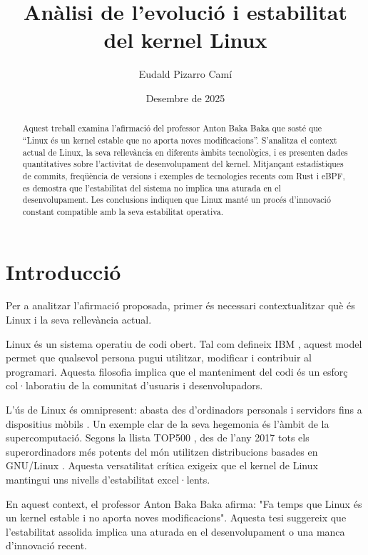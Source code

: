 \documentclass{article}
\title{Anàlisi de l'evolució i estabilitat del kernel Linux}
\author{Eudald Pizarro Camí}
\date{Desembre de 2025}
\begin{document}
\maketitle

\newpage 

\tableofcontents

\newpage 

\begin{abstract}
Aquest treball examina l'afirmació del professor Anton Baka Baka que sosté que ``Linux és un kernel estable que no aporta noves modificacions''. S'analitza el context actual de Linux, la seva rellevància en diferents àmbits tecnològics, i es presenten dades quantitatives sobre l'activitat de desenvolupament del kernel. Mitjançant estadístiques de commits, freqüència de versions i exemples de tecnologies recents com Rust i eBPF, es demostra que l'estabilitat del sistema no implica una aturada en el desenvolupament. Les conclusions indiquen que Linux manté un procés d'innovació constant compatible amb la seva estabilitat operativa.
\end{abstract}

\newpage

\section{Introducció}

Per a analitzar l'afirmació proposada, primer és necessari contextualitzar què és Linux i la seva rellevància actual.

Linux és un sistema operatiu de codi obert. Tal com defineix IBM \cite{ibm_open_source}, aquest model permet que qualsevol persona pugui utilitzar, modificar i contribuir al programari. Aquesta filosofia implica que el manteniment del codi és un esforç col·laboratiu de la comunitat d'usuaris i desenvolupadors.

L'ús de Linux és omnipresent: abasta des d'ordinadors personals i servidors fins a dispositius mòbils \cite{ibm_linux} \cite{redhat_linux}. Un exemple clar de la seva hegemonia és l'àmbit de la supercomputació. Segons la llista TOP500 \cite{top500_list}, des de l'any 2017 tots els superordinadors més potents del món utilitzen distribucions basades en GNU/Linux \cite{wikipedia_gnu_linux}. Aquesta versatilitat crítica exigeix que el kernel de Linux mantingui uns nivells d'estabilitat excel·lents.

En aquest context, el professor Anton Baka Baka afirma: "Fa temps que Linux és un kernel estable i no aporta noves modificacions". Aquesta tesi suggereix que l'estabilitat assolida implica una aturada en el desenvolupament o una manca d'innovació recent.
\end{document}
